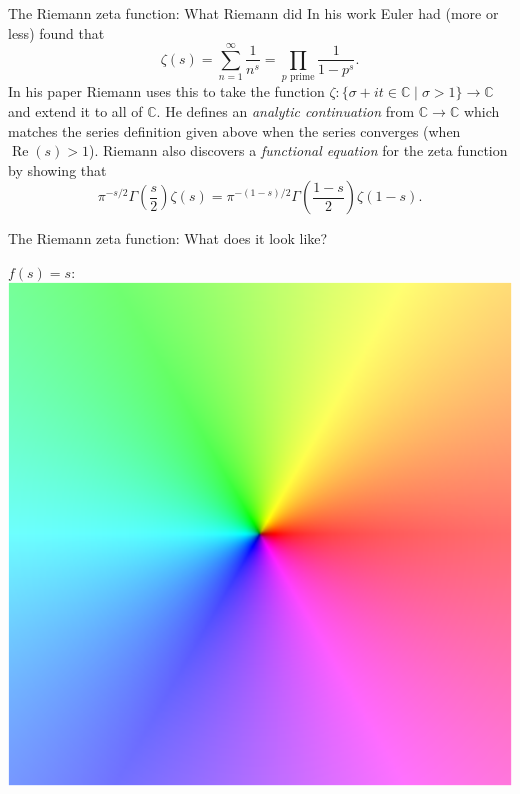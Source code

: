 \documentclass{beamer}
\begin{document}
\begin{frame}{The Riemann zeta function: What Riemann did}
In his work Euler had (more or less) found that 
\[\zeta(s) = \sum_{n=1}^{\infty}\frac{1}{n^s} = \prod_{p \text{ prime}}\frac{1}{1-p^s}.\]
\pause In his paper Riemann uses this to take the function $\zeta\colon \{\sigma + it \in\mathbb{C}\mid \sigma > 1\} \to \mathbb{C}$ and extend it to all of $\mathbb{C}$.
\pause He defines an \emph{analytic continuation} from $\mathbb{C} \to \mathbb{C}$ which matches the series definition given above when the series converges (when $\operatorname{Re}(s) > 1$).
\pause Riemann also discovers a \emph{functional equation} for the zeta function by showing that
\[ \pi^{-s/2} \Gamma\left(\frac{s}{2}\right)\zeta(s) = \pi^{-(1-s)/2} \Gamma\left(\frac{1-s}{2}\right) \zeta(1-s).\]
\end{frame}

\begin{frame}{The Riemann zeta function: What does it look like?}
\begin{center}
$f(s) = s$:\\[0.7em]\includegraphics[height=0.75\textheight]{img/id}
\end{center}
\end{frame}
\end{document}
